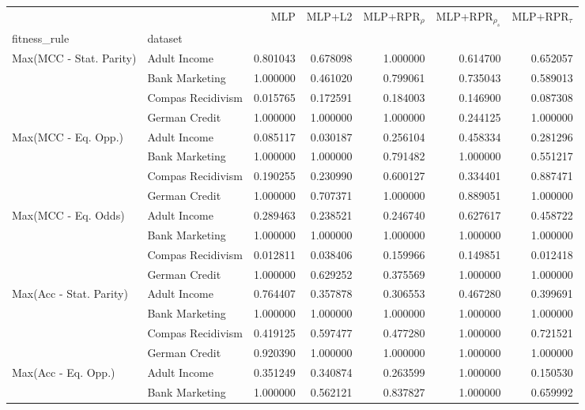 \begin{tabular}{llrrrrr}
\toprule
 &  & MLP & MLP+L2 & MLP+RPR$_{\rho}$ & MLP+RPR$_{\rho_s}$ & MLP+RPR$_{\tau}$ \\
fitness_rule & dataset &  &  &  &  &  \\
\midrule
\multirow[t]{4}{*}{Max(MCC - Stat. Parity)} & Adult Income & 0.801043 & 0.678098 & 1.000000 & 0.614700 & 0.652057 \\
 & Bank Marketing & 1.000000 & 0.461020 & 0.799061 & 0.735043 & 0.589013 \\
 & Compas Recidivism & 0.015765 & 0.172591 & 0.184003 & 0.146900 & 0.087308 \\
 & German Credit & 1.000000 & 1.000000 & 1.000000 & 0.244125 & 1.000000 \\
\cline{1-7}
\multirow[t]{4}{*}{Max(MCC - Eq. Opp.)} & Adult Income & 0.085117 & 0.030187 & 0.256104 & 0.458334 & 0.281296 \\
 & Bank Marketing & 1.000000 & 1.000000 & 0.791482 & 1.000000 & 0.551217 \\
 & Compas Recidivism & 0.190255 & 0.230990 & 0.600127 & 0.334401 & 0.887471 \\
 & German Credit & 1.000000 & 0.707371 & 1.000000 & 0.889051 & 1.000000 \\
\cline{1-7}
\multirow[t]{4}{*}{Max(MCC - Eq. Odds)} & Adult Income & 0.289463 & 0.238521 & 0.246740 & 0.627617 & 0.458722 \\
 & Bank Marketing & 1.000000 & 1.000000 & 1.000000 & 1.000000 & 1.000000 \\
 & Compas Recidivism & 0.012811 & 0.038406 & 0.159966 & 0.149851 & 0.012418 \\
 & German Credit & 1.000000 & 0.629252 & 0.375569 & 1.000000 & 1.000000 \\
\cline{1-7}
\multirow[t]{4}{*}{Max(Acc - Stat. Parity)} & Adult Income & 0.764407 & 0.357878 & 0.306553 & 0.467280 & 0.399691 \\
 & Bank Marketing & 1.000000 & 1.000000 & 1.000000 & 1.000000 & 1.000000 \\
 & Compas Recidivism & 0.419125 & 0.597477 & 0.477280 & 1.000000 & 0.721521 \\
 & German Credit & 0.920390 & 1.000000 & 1.000000 & 1.000000 & 1.000000 \\
\cline{1-7}
\multirow[t]{4}{*}{Max(Acc - Eq. Opp.)} & Adult Income & 0.351249 & 0.340874 & 0.263599 & 1.000000 & 0.150530 \\
 & Bank Marketing & 1.000000 & 0.562121 & 0.837827 & 1.000000 & 0.659992 \\

\end{tabular}
